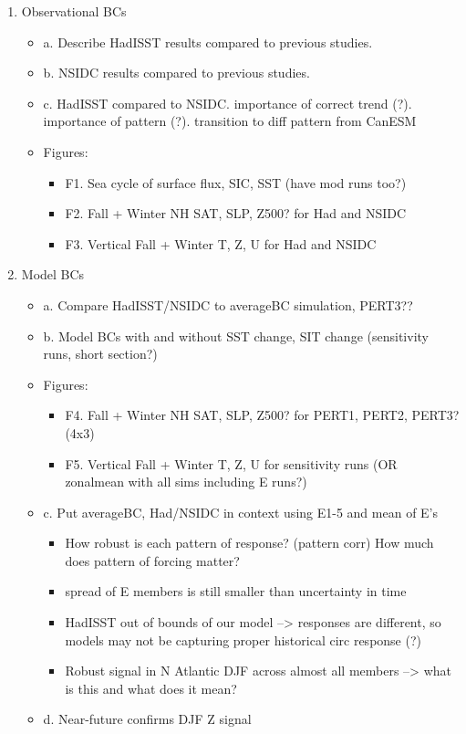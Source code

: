 \documentclass[twocol]{ametsoc}
\begin{document}
\begin{enumerate}
\item Observational BCs
	\begin{itemize}
	\item a. Describe HadISST results compared to previous studies.
    	\item b. NSIDC results compared to previous studies.
	\item c. HadISST compared to NSIDC. importance of correct trend (?). importance of pattern (?). transition to diff pattern from CanESM

	\item Figures:
		\begin{itemize}
		\item F1. Sea cycle of surface flux, SIC, SST (have mod runs too?)
	 	\item F2. Fall + Winter NH SAT, SLP, Z500? for Had and NSIDC	
		\item F3. Vertical Fall + Winter T, Z, U for Had and NSIDC	
		\end{itemize}
	\end{itemize}

\item Model BCs
	\begin{itemize}
	\item a. Compare HadISST/NSIDC to averageBC simulation, PERT3??
	\item b. Model BCs with and without SST change, SIT change (sensitivity runs, short section?)
	
	\item Figures:
		\begin{itemize}
		\item F4. Fall + Winter NH SAT, SLP, Z500? for PERT1, PERT2, PERT3? (4x3)
		\item F5. Vertical Fall + Winter T, Z, U for sensitivity runs (OR zonalmean with all sims including E runs?)  
                       \end{itemize}
	
	
	\item c. Put averageBC, Had/NSIDC in context using E1-5 and mean of E's
		\begin{itemize}
		\item How robust is each pattern of response? (pattern corr) How much does pattern of forcing matter?
		\item spread of E members is still smaller than uncertainty in time
		\item HadISST out of bounds of our model --> responses are different, so models may not be capturing proper historical circ response (?)
		\item Robust signal in N Atlantic DJF across almost all members --> what is this and what does it mean? 
		\end{itemize}

	\item d. Near-future confirms DJF Z signal

	\end{itemize}

\end{enumerate}
\end{document}
